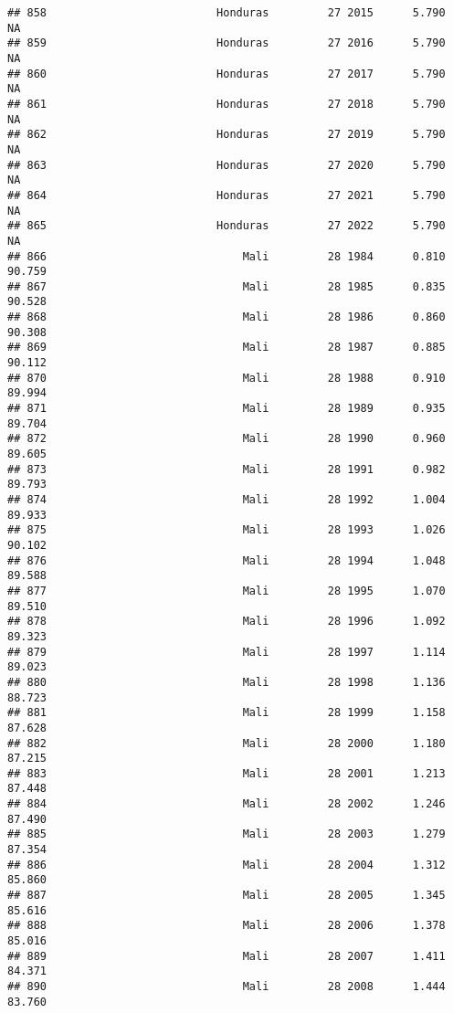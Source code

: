 \documentclass[
]{article}
\begin{document}
\begin{verbatim}
## 858                          Honduras         27 2015      5.790         NA
## 859                          Honduras         27 2016      5.790         NA
## 860                          Honduras         27 2017      5.790         NA
## 861                          Honduras         27 2018      5.790         NA
## 862                          Honduras         27 2019      5.790         NA
## 863                          Honduras         27 2020      5.790         NA
## 864                          Honduras         27 2021      5.790         NA
## 865                          Honduras         27 2022      5.790         NA
## 866                              Mali         28 1984      0.810     90.759
## 867                              Mali         28 1985      0.835     90.528
## 868                              Mali         28 1986      0.860     90.308
## 869                              Mali         28 1987      0.885     90.112
## 870                              Mali         28 1988      0.910     89.994
## 871                              Mali         28 1989      0.935     89.704
## 872                              Mali         28 1990      0.960     89.605
## 873                              Mali         28 1991      0.982     89.793
## 874                              Mali         28 1992      1.004     89.933
## 875                              Mali         28 1993      1.026     90.102
## 876                              Mali         28 1994      1.048     89.588
## 877                              Mali         28 1995      1.070     89.510
## 878                              Mali         28 1996      1.092     89.323
## 879                              Mali         28 1997      1.114     89.023
## 880                              Mali         28 1998      1.136     88.723
## 881                              Mali         28 1999      1.158     87.628
## 882                              Mali         28 2000      1.180     87.215
## 883                              Mali         28 2001      1.213     87.448
## 884                              Mali         28 2002      1.246     87.490
## 885                              Mali         28 2003      1.279     87.354
## 886                              Mali         28 2004      1.312     85.860
## 887                              Mali         28 2005      1.345     85.616
## 888                              Mali         28 2006      1.378     85.016
## 889                              Mali         28 2007      1.411     84.371
## 890                              Mali         28 2008      1.444     83.760

\end{verbatim}
\end{document}
